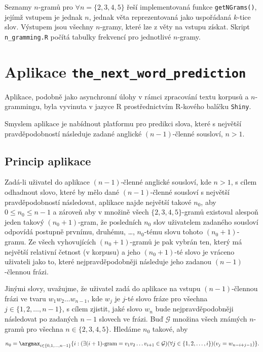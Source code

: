 Seznamy $n$-gramů pro $\forall n = \{2, 3, 4, 5\}$ řeší implementovaná funkce \texttt{getNGrams()}, jejímž vstupem je jednak $n$, jednak věta reprezentovaná jako uspořádaná $k$-tice slov. Výstupem jsou všechny $n$-gramy, které lze z věty na vstupu získat. Skript \texttt{n\_gramming.R} počítá tabulky frekvencí pro jednotlivé $n$-gramy.



\section{Aplikace \texttt{the\_next\_word\_prediction}}

Aplikace, podobně jako asynchronní úlohy v rámci zpracování textu korpusů a $n$-grammingu, byla vyvinuta v jazyce \textsf{R} prostřednictvím \textsf{R}-kového balíčku \texttt{Shiny}.

Smyslem aplikace je nabídnout platformu pro predikci slova, které s největší pravděpodobností následuje zadané anglické $(n - 1)$-členné sousloví, $n > 1$.


\subsection{Princip aplikace}

Zadá-li uživatel do aplikace $(n - 1)$-členné anglické sousloví, kde $n > 1$, s cílem odhadnout slovo, které by mělo dané $(n - 1)$-členné sousloví s největší pravděpodobností následovat, aplikace najde největší takové $n_{0}$, aby $0 \leq n_{0} \leq n - 1$ a zároveň aby v množině všech $\{2, 3, 4, 5\}$-gramů existoval alespoň jeden takový $(n_{0} + 1)$-gram, že posledních $n_{0}$ slov uživatelem zadaného sousloví odpovídá postupně prvnímu, druhému, \ldots, $n_{0}$-tému slovu tohoto $(n_{0} + 1)$-gramu. Ze všech vyhovujících $(n_{0} + 1)$-gramů je pak vybrán ten, který má největší relativní četnost (v korpusu) a jeho $(n_{0} + 1)$-té slovo je vráceno uživateli jako to, které nejpravděpodobněji následuje jeho zadanou $(n - 1)$-člennou frázi.

Jinými slovy, uvažujme, že uživatel zadá do aplikace na vstupu $(n - 1)$-člennou frázi ve tvaru $w_{1}w_{2} \ldots w_{n - 1}$, kde $w_{j}$ je $j$-té slovo fráze pro všechna $j \in \{ 1, 2, \ldots, n - 1 \}$, s cílem zjistit, jaké slovo $w_{n}$ bude nejpravděpodobněji následovat po zadaných $n - 1$ slovech ve frázi. Buď $\mathcal{G}$ množina všech známých $n$-gramů pro všechna $n \in \{2, 3, 4, 5\}$. Hledáme $n_{0}$ takové, aby

\begin{equation*}
  n_{0} = \argmax_{i \in \{ 0, 1, \ldots, n - 1 \}} \{i : (\exists (i + 1)\text{-gram} = v_{1}v_{2} \ldots v_{i + 1} \in \mathcal{G})(\forall j \in \{1, 2, \ldots, i\})(v_{j} = w_{n - i + j - 1}) \}.
\end{equation*}

